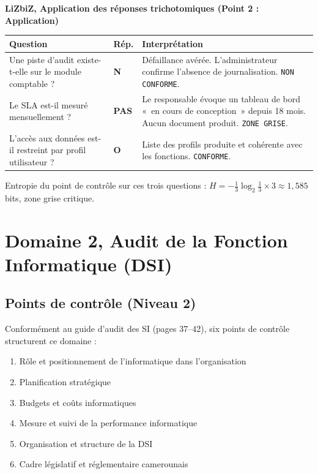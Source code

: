 \begin{boxlizbiz}
\textbf{LiZbiZ, Application des réponses trichotomiques (Point 2 : Application)}

\smallskip
\begin{tabular}{p{5.5cm}p{1cm}p{6cm}}
\textbf{Question} & \textbf{Rép.} & \textbf{Interprétation} \\
\midrule
Une piste d'audit existe-t-elle sur le module comptable ? & \textbf{N} & Défaillance avérée. L'administrateur confirme l'absence de journalisation. \texttt{NON CONFORME}. \\
\addlinespace
Le SLA est-il mesuré mensuellement ? & \textbf{PAS} & Le responsable évoque un tableau de bord «~en cours de conception~» depuis 18 mois. Aucun document produit. \texttt{ZONE GRISE}. \\
\addlinespace
L'accès aux données est-il restreint par profil utilisateur ? & \textbf{O} & Liste des profils produite et cohérente avec les fonctions. \texttt{CONFORME}. \\
\end{tabular}

\smallskip
Entropie du point de contrôle sur ces trois questions : $H = -\frac{1}{3}\log_2\frac{1}{3} \times 3 \approx 1{,}585$ bits, zone grise critique.
\end{boxlizbiz}


\section{Domaine 2, Audit de la Fonction Informatique (DSI)}
\label{sec:decomp-dsi}

\subsection{Points de contrôle (Niveau 2)}

Conformément au guide d'audit des SI (pages 37--42), six points de contrôle structurent ce domaine :

\begin{enumerate}
    \item Rôle et positionnement de l'informatique dans l'organisation
    \item Planification stratégique
    \item Budgets et coûts informatiques
    \item Mesure et suivi de la performance informatique
    \item Organisation et structure de la DSI
    \item Cadre législatif et réglementaire camerounais
\end{enumerate}

